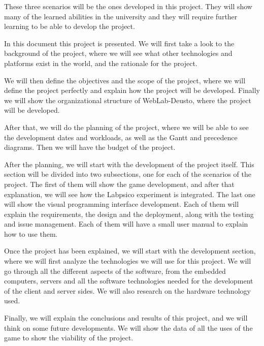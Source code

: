 These three scenarios will be the ones developed in this project. They will show many of the learned
abilities in the university and they will require further learning to be able to develop the
project.

In this document this project is presented. We will first take a look to the background of the
project, where we will see what other technologies and platforms exist in the world, and the
rationale for the project.

We will then define the objectives and the scope of the project, where we will define the project
perfectly and explain how the project will be developed. Finally we will show the organizational
structure of WebLab-Deusto, where the project will be developed.

After that, we will do the planning of the project, where we will be able to see the development
dates and workloads, as well as the Gantt and precedence diagrams. Then we will have the budget of
the project.

After the planning, we will start with the development of the project itself. This section will be
divided into two subsections, one for each of the scenarios of the project. The first of them will
show the game development, and after that explanation, we will see how the Labpsico experiment is
integrated. The last one will show the visual programming interface development. Each of them will
explain the requirements, the design and the deployment, along with the testing and issue
management. Each of them will have a small user manual to explain how to use them.

Once the project has been explained, we will start with the development section, where we will first
analyze the technologies we will use for this project. We will go through all the different aspects
of the software, from the embedded computers, servers and all the software technologies needed for
the development of the client and server sides. We will also research on the hardware technology
used.

Finally, we will explain the conclusions and results of this project, and we will think on some
future developments. We will show the data of all the uses of the game to show the viability of the
project.
